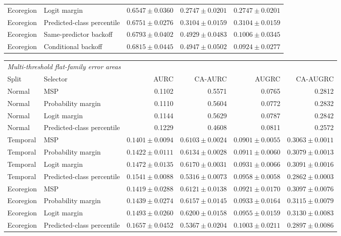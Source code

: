 \begin{table}[htbp]
\begin{tabular}{llrrr}
Ecoregion & Logit margin & $0.6547\pm0.0360$ & $0.2747\pm0.0201$ & $0.2747\pm0.0201$ \\
Ecoregion & Predicted-class percentile & $0.6751\pm0.0276$ & $0.3104\pm0.0159$ & $0.3104\pm0.0159$ \\
Ecoregion & Same-predictor backoff & $0.6793\pm0.0402$ & $0.4929\pm0.0483$ & $0.1006\pm0.0345$ \\
Ecoregion & Conditional backoff & $0.6815\pm0.0445$ & $0.4947\pm0.0502$ & $0.0924\pm0.0277$ \\
\bottomrule
\end{tabular}
\par\medskip
\begin{tabular}{llrrrr}
\toprule
\multicolumn{6}{l}{\textit{Multi-threshold flat-family error areas}} \\
Split & Selector & AURC & CA-AURC & AUGRC & CA-AUGRC \\
\midrule
Normal & MSP & 0.1102 & 0.5571 & 0.0765 & 0.2812 \\
Normal & Probability margin & 0.1110 & 0.5604 & 0.0772 & 0.2832 \\
Normal & Logit margin & 0.1144 & 0.5629 & 0.0787 & 0.2842 \\
Normal & Predicted-class percentile & 0.1229 & 0.4608 & 0.0811 & 0.2572 \\
Temporal & MSP & $0.1401\pm0.0094$ & $0.6103\pm0.0024$ & $0.0901\pm0.0055$ & $0.3063\pm0.0011$ \\
Temporal & Probability margin & $0.1422\pm0.0111$ & $0.6134\pm0.0028$ & $0.0911\pm0.0060$ & $0.3079\pm0.0013$ \\
Temporal & Logit margin & $0.1472\pm0.0135$ & $0.6170\pm0.0031$ & $0.0931\pm0.0066$ & $0.3091\pm0.0016$ \\
Temporal & Predicted-class percentile & $0.1541\pm0.0088$ & $0.5316\pm0.0073$ & $0.0958\pm0.0058$ & $0.2862\pm0.0003$ \\
Ecoregion & MSP & $0.1419\pm0.0288$ & $0.6121\pm0.0138$ & $0.0921\pm0.0170$ & $0.3097\pm0.0076$ \\
Ecoregion & Probability margin & $0.1439\pm0.0274$ & $0.6157\pm0.0145$ & $0.0933\pm0.0164$ & $0.3115\pm0.0079$ \\
Ecoregion & Logit margin & $0.1493\pm0.0260$ & $0.6200\pm0.0158$ & $0.0955\pm0.0159$ & $0.3130\pm0.0083$ \\
Ecoregion & Predicted-class percentile & $0.1657\pm0.0452$ & $0.5367\pm0.0204$ & $0.1003\pm0.0211$ & $0.2897\pm0.0086$ \\
\bottomrule
\end{tabular}
\end{table}

